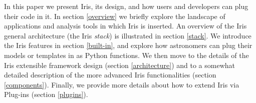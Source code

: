 In this paper we present Iris, its design, and how users and developers can plug their code in it. In section \ref{overview} we briefly explore the landscape of applications and analysis tools in which Iris is inserted. An overview of the Iris general architecture (the Iris \emph{stack}) is illustrated in section \ref{stack}. We introduce the Iris features in section \ref{built-in}, and explore how astronomers can plug their models or templates in as Python functions. We then move to the details of the Iris extensible framework design (section \ref{architecture}) and to a somewhat detailed description of the more advanced Iris functionalities (section \ref{components}). Finally, we provide more details about how to extend Iris via Plug-ins (section \ref{plugins}).